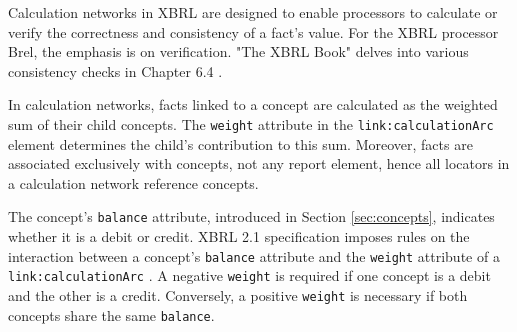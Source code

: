 
Calculation networks in XBRL are designed to enable processors to calculate or verify the correctness and consistency of a fact's value.  
For the XBRL processor Brel, the emphasis is on verification.  
"The XBRL Book" delves into various consistency checks in Chapter 6.4 \cite{fourny2023xbrl}.  

In calculation networks, facts linked to a concept are calculated as the weighted sum of their child concepts.  
The \texttt{weight} attribute in the \texttt{link:calculationArc} element determines the child's contribution to this sum.  
Moreover, facts are associated exclusively with concepts, not any report element,  
hence all locators in a calculation network reference concepts.  

The concept's \texttt{balance} attribute, introduced in Section \ref{sec:concepts}, indicates whether it is a debit or credit.  
XBRL 2.1 specification imposes rules on the interaction between a concept's \texttt{balance} attribute and the \texttt{weight} attribute of a \texttt{link:calculationArc} \cite{xbrl21_concept}.  
A negative \texttt{weight} is required if one concept is a debit and the other is a credit.  
Conversely, a positive \texttt{weight} is necessary if both concepts share the same \texttt{balance}.

